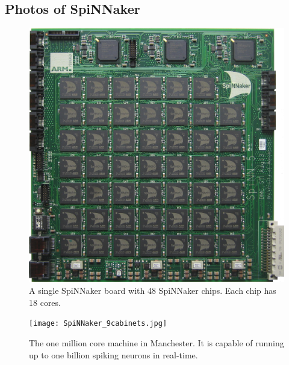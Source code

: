 \documentclass{article}
\begin{document}




\begin{appendices}
\section{Photos of SpiNNaker}
\label{sec:spinn_photos}

\begin{figure}[H]
  \includegraphics[width=\linewidth]{spinnakerBoard.jpg}
  \caption{A single SpiNNaker board with 48 SpiNNaker
    chips. Each chip has 18 cores.}
\end{figure}

\begin{figure}[H]
  \texttt{[image: SpiNNaker\_9cabinets.jpg]}
  \caption{The one million core machine in Manchester.
    It is capable of running up to one billion spiking
    neurons in real-time.}
\end{figure}

\end{appendices}
\end{document}
